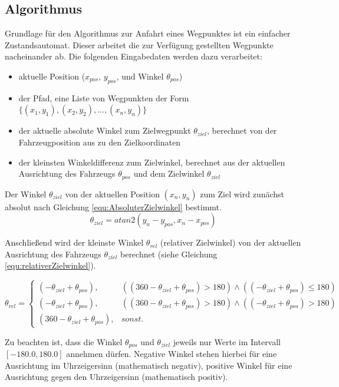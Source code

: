 \subsection{Algorithmus}
Grundlage für den Algorithmus zur Anfahrt eines Wegpunktes ist ein einfacher Zustandsautomat. Dieser arbeitet die zur Verfügung gestellten Wegpunkte nacheinander ab. Die folgenden Eingabedaten werden dazu verarbeitet:
\begin{itemize}
\item aktuelle Position ($x_{pos}$, $y_{pos}$, und Winkel $ \theta_{pos} $)
\item der Pfad, eine Liste von Wegpunkten der Form $ \{(x_1, y_1), (x_2, y_2), ..., (x_n, y_n)\} $
\item der aktuelle absolute Winkel zum Zielwegpunkt $\theta_{ziel}$, berechnet von der Fahrzeugposition aus zu den Zielkoordinaten
\item der kleinsten Winkeldifferenz zum Zielwinkel, berechnet aus der aktuellen Ausrichtung des Fahrzeugs $\theta_{pos}$ und dem Zielwinkel $\theta_{ziel}$
\end{itemize}

Der Winkel $\theta_{ziel}$ von der aktuellen Position $(x_n, y_n)$ zum Ziel wird zunächst absolut nach Gleichung  \ref{equ:AbsoluterZielwinkel} bestimmt.
\begin{equation}
\theta_{ziel} = atan2(y_n - y_{pos}, x_n - x_{pos})
\label{equ:AbsoluterZielwinkel}
\end{equation}

Anschließend wird der kleinste Winkel $\theta_{rel}$ (relativer Zielwinkel) von der aktuellen Ausrichtung des Fahrzeugs $\theta_{ziel}$ berechnet (siehe Gleichung \ref{equ:relativerZielwinkel}).

\begin{equation}
\theta_{rel} = \left\{
\begin{array}{ll}
(-\theta_{ziel} + \theta_{pos}) , & ((360 - \theta_{ziel} + \theta_{pos}) > 180) \wedge ((-\theta_{ziel} + \theta_{pos}) \leq 180) \\
(-\theta_{ziel} + \theta_{pos}) , & ((360 - \theta_{ziel} + \theta_{pos}) > 180) \wedge ((-\theta_{ziel} + \theta_{pos}) > 180) \\
(360 - \theta_{ziel} + \theta_{pos}), & sonst.
\end{array}
\right.
\label{equ:relativerZielwinkel}
\end{equation}

Zu beachten ist, dass die Winkel $\theta_{pos}$ und $\theta_{ziel}$ jeweils nur Werte im Intervall \\ $[-180.0, 180.0]$ annehmen dürfen. Negative Winkel stehen hierbei für eine Ausrichtung im Uhrzeigersinn (mathematisch negativ), positive Winkel für eine Ausrichtung gegen den Uhrzeigersinn (mathematisch positiv).

